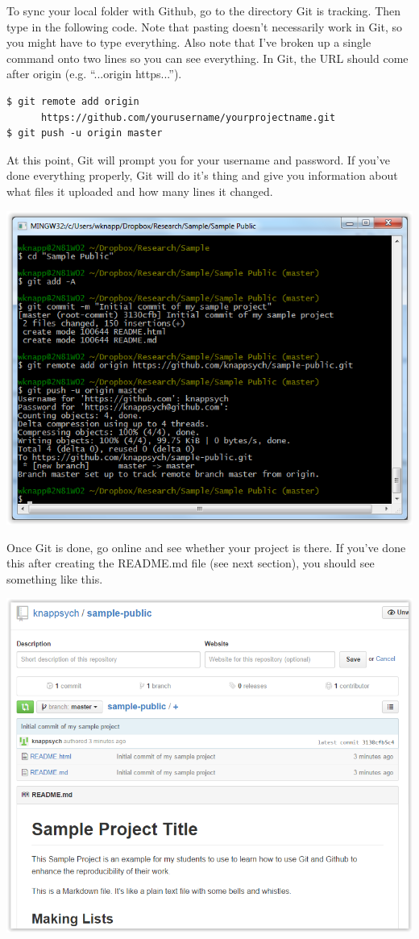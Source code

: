 \documentclass[12pt]{article}
\begin{document}
To sync your local folder with Github, go to the directory Git is tracking. Then type in the
following code. Note that pasting doesn't necessarily work in Git, so you might have to type
everything. Also note that I've broken up a single command onto two lines so you can see
everything. In Git, the URL should come after origin (e.g. ``...origin https...'').

\begin{verbatim}
$ git remote add origin
      https://github.com/yourusername/yourprojectname.git
$ git push -u origin master
\end{verbatim}

At this point, Git will prompt you for your username and password. If you've done everything properly,
Git will do it's thing and give you information about what files it uploaded and how many lines
it changed.

\includegraphics{imgs/Github05.PNG}

Once Git is done, go online and see whether your project is there. If you've done this after creating
the README.md file (see next section), you should see something like this.

\includegraphics{imgs/Github06.PNG}
\end{document}
